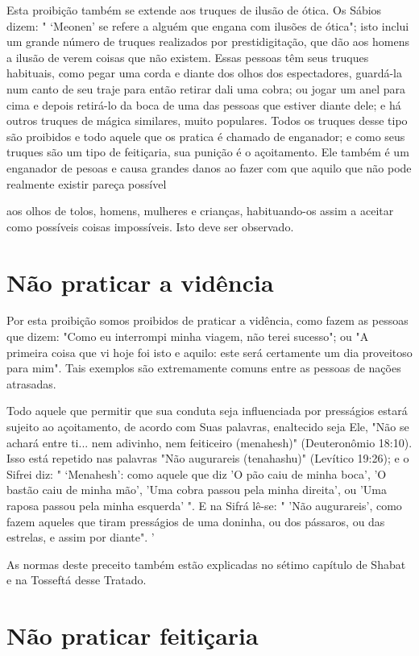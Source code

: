 \begin{itemize}
\begin{enumrate}
\begin{itemize}
\begin{itemize}
\begin{itemize}
Esta proibição também se extende aos truques de ilusão de ótica. Os
Sábios dizem: " `Meonen' se refere a alguém que engana com ilusões de
óti­ca"; isto inclui um grande número de truques realizados por
prestidigitação, que dão aos homens a ilusão de verem coisas que não
existem. Essas pessoas têm seus truques habituais, como pegar uma corda
e diante dos olhos dos es­pectadores, guardá-la num canto de seu traje
para então retirar dali uma cobra; ou jogar um anel para cima e depois
retirá-lo da boca de uma das pessoas que estiver diante dele; e há
outros truques de mágica similares, muito populares. Todos os truques
desse tipo são proibidos e todo aquele que os pratica é cha­mado de
enganador; e como seus truques são um tipo de feitiçaria, sua punição é
o açoitamento. Ele também é um enganador de pesoas e causa grandes
da­nos ao fazer com que aquilo que não pode realmente existir pareça
possível


aos olhos de tolos, homens, mulheres e crianças, habituando-os assim a
aceitar como possíveis coisas impossíveis. Isto deve ser observado.

\section{Não praticar a vidência}

Por esta proibição somos proibidos de praticar a vidência, como fa­zem
as pessoas que dizem: "Como eu interrompi minha viagem, não terei
su­cesso"; ou "A primeira coisa que vi hoje foi isto e aquilo: este será
certamente um dia proveitoso para mim". Tais exemplos são extremamente
comuns entre as pessoas de nações atrasadas.

Todo aquele que permitir que sua conduta seja influenciada por
pres­ságios estará sujeito ao açoitamento, de acordo com Suas palavras,
enaltecido seja Ele, "Não se achará entre ti... nem adivinho, nem
feiticeiro (menahesh)" (Deuteronômio 18:10). Isso está repetido nas
palavras "Não augurareis (tena­hashu)" (Levítico 19:26); e o Sifrei diz:
" `Menahesh': como aquele que diz 'O pão caiu de minha boca', 'O bastão
caiu de minha mão', 'Uma cobra passou pela minha direita', ou 'Uma
raposa passou pela minha esquerda' ". E na Sifrá lê-se: " 'Não
augurareis', como fazem aqueles que tiram presságios de uma do­ninha, ou
dos pássaros, ou das estrelas, e assim por diante". '

As normas deste preceito também estão explicadas no sétimo capí­tulo de
Shabat e na Tosseftá desse Tratado.

\section{Não praticar feitiçaria}


\end{itemize}
\end{itemize}
\end{itemize}
\end{enumrate}
\end{itemize}
